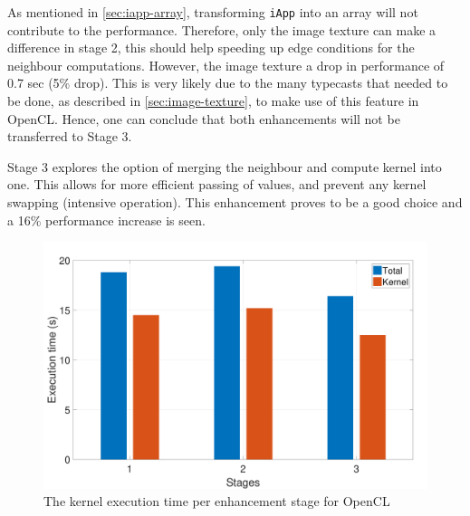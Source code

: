 \documentclass[final]{report}
\begin{document}
As mentioned in \cref{sec:iapp-array}, transforming \texttt{iApp} into an array will not contribute to the performance.
Therefore, only the image texture can make a difference in stage 2, this should help speeding up edge conditions for the neighbour computations.
However, the image texture a drop in performance of 0.7 sec (5\% drop).
This is very likely due to the many typecasts that needed to be done, as described in \cref{sec:image-texture}, to make use of this feature in OpenCL.
Hence, one can conclude that both enhancements will not be transferred to Stage 3.

Stage 3 explores the option of merging the neighbour and compute kernel into one.
This allows for more efficient passing of values, and prevent any kernel swapping (intensive operation).
This enhancement proves to be a good choice and a 16\% performance increase is seen.



\begin{figure}[H]
\centering
    \includegraphics[width=\textwidth]{resources/opencl-per-stage-graph.pdf}
    \caption{The kernel execution time per enhancement stage for OpenCL}
    \label{fig:opencl-per-stage-graph}
\end{figure}
\end{document}

